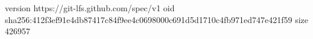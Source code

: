 version https://git-lfs.github.com/spec/v1
oid sha256:412f3ef91e4db87417c84f9ee4c0698000c691d5d1710c4fb971ed747e421f59
size 426957

